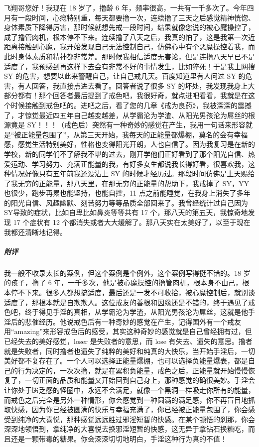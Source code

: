 \begin{case}
    飞翔哥您好！我现在 18 岁了，撸龄 6 年，频率很高，一共有一千多次了。今年四月有一段时间，心瘾特别重，每天都要撸一次，连续撸了三天之后感觉精神恍惚、身体素质下降得厉害，那时候就想先戒一段时间，结果就像您说的被心魔操控了，成了撸管肉机，根本停不下来。连续撸了八天之后，我真的怕了，这是我第一次近距离接触到心魔，我开始发现自己无法控制自己，仿佛心中有个恶魔操控着我，而此时身体素质和精神都非常差。那时候我相信适度无害论，但是连撸八天早已不是适度了，我预感到再这样下去会有非常不好的事情发生，比如猝死！于是我上网搜 SY 的危害，想要以此来警醒自己，让自己戒几天。百度知道里有人问过 SY 的危害，有人回答，我直接点进去看了。回答者说了很多 SY 的坏处，我发现我身上大部分都有！那个回答者最后提到了戒色吧，我很好奇，就点进吧看看，我就是在这个时候接触到戒色吧的。进吧之后，看了您的几章《戒为良药》，我被深深的震撼了，才惊觉最近四五年自己越变越差，从学霸沦为学渣、从阳光男孩沦为屌丝的根源竟是 SY！！！（戒色后）突然有一种奇妙的感觉在产生，我用一句话来形容就是“被正能量包围了”，从第三天开始，我每天的正能量都爆棚，莫名的会有幸福感，感觉生活特别美好，性格也变得阳光开朗，人也自信了。因为我复习是在新的学校，新的同学们不了解我不堪的过去，刚开学他们正好看到了那个阳光自信、热爱运动、学习努力、充满正能量的我，有好多女生都说我长得好看，很喜欢我，这种情况好像只有五年前我还没沾上 SY 的时候才经历过。那段时间仿佛是上天赐给了我无穷的正能量，那八天里，在那无穷的正能量的帮助下，我戒掉了 SY，YY 也很少，跑步再累也能坚持，也能自控，11 点之前能睡觉，在我身上消失了多年的阳光自信、风趣幽默、刻苦努力等等品质全部回来了。我曾经统计过自己因为SY导致的症状，比如自卑比如鼻炎等等共有 17 个，那八天的第五天，我惊奇地发现 17 个症状有 12 个都消失或者大大缓解了。那八天实在太美好了，以至于现在我都还清晰地记得。
    \subparagraph{附评} 我一般不收录太长的案例，但这个案例是个例外，这个案例写得挺不错的。18 岁的孩子，撸了 6 年，一千多次，他是被心魔操控的撸管肉机，根本身不由己，根本停不下来。很多人都想搞适度，最后还是一发不可收拾，被心魔控制后，就别谈适度了，那根本就是自欺欺人。这位戒友的善根和因缘还是不错的，终于遇见了戒色吧，终于得见手淫的真相，从学霸沦为学渣，从阳光男孩沦为屌丝，这就是他手淫后的悲催经历。他说戒色后有一种奇妙的感觉在产生，记得国外有一个戒友用“amazing”来形容戒色后的感受，其实这种奇妙的感觉就是自己曾经拥有过，但已经失去的美好感觉，loser 是失败者的意思，而 lose 有失去、遗失的意思。撸者就是失败者，同时撸者也遗失了纯粹的美好和纯真的大快乐，当开始手淫后，一切美好都不复存在了。一个人可以选择正能量爆棚，也可以选择负能量爆表，都是自己的行为决定的，一次次撸，就是在累积负能量，戒色之后，正能量就开始慢慢恢复了，一切正面的品质和能量又开始回到自己身上，那种感觉的确很美妙。手淫会让你处于匮乏感的怪圈中，永远不会满足，就像一个黑洞一样吸走你所有的能量，而戒色之后完全是另外一种情形，你会感觉到一种圆满的满足感，你不再盲目地抓取快感，因为你已经被圆满的快乐与幸福充满了，你已经被正能量包围了，你会感受到纯净的大喜悦，那种感觉远远胜过邪淫短暂的快感。在某个顿悟的刹那，你会深深地领悟到，拿纯净的大喜悦去换邪淫短暂的快感，这无异于拿钻石换糖吃，而且还是一颗带毒的糖果。你会深深切切地明白，手淫这种行为真的不值！


\end{case}
